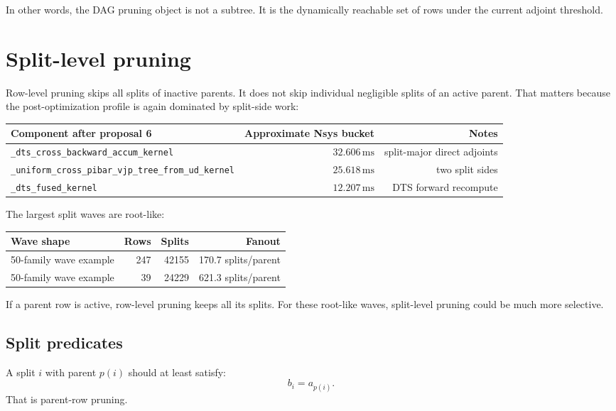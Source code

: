 \documentclass[11pt]{article}
\newcommand{\ms}{\,\mathrm{ms}}
\newcommand{\code}[1]{\texttt{#1}}
\begin{document}
In other words, the DAG pruning object is not a subtree.  It is the dynamically
reachable set of rows under the current adjoint threshold.

\section{Split-level pruning}

Row-level pruning skips all splits of inactive parents.  It does not skip
individual negligible splits of an active parent.  That matters because the
post-optimization profile is again dominated by split-side work:

\begin{center}
\begin{tabular}{lrr}
\toprule
Component after proposal 6 & Approximate Nsys bucket & Notes \\
\midrule
\code{\_dts\_cross\_backward\_accum\_kernel} & $32.606\ms$ & split-major direct adjoints \\
\code{\_uniform\_cross\_pibar\_vjp\_tree\_from\_ud\_kernel} & $25.618\ms$ & two split sides \\
\code{\_dts\_fused\_kernel} & $12.207\ms$ & DTS forward recompute \\
\bottomrule
\end{tabular}
\end{center}

The largest split waves are root-like:

\begin{center}
\begin{tabular}{lrrr}
\toprule
Wave shape & Rows & Splits & Fanout \\
\midrule
50-family wave example & 247 & 42155 & 170.7 splits/parent \\
50-family wave example & 39 & 24229 & 621.3 splits/parent \\
\bottomrule
\end{tabular}
\end{center}

If a parent row is active, row-level pruning keeps all its splits.  For these
root-like waves, split-level pruning could be much more selective.

\subsection{Split predicates}

A split \(i\) with parent \(p(i)\) should at least satisfy:
\[
  b_i = a_{p(i)}.
\]
That is parent-row pruning.
\end{document}
